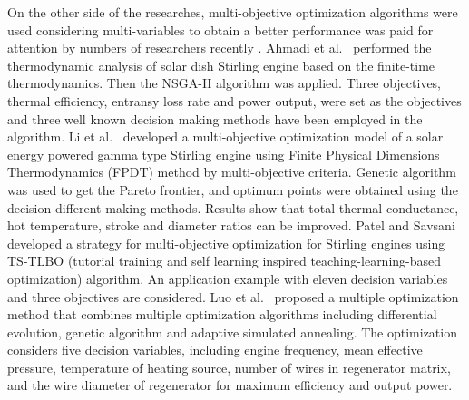 \documentclass[review,3p,10t]{elsarticle}
\begin{document}
On the other side of the researches, multi-objective optimization algorithms were used considering multi-variables to obtain a better performance was paid for attention by numbers of researchers recently%
.
Ahmadi et al.~\cite{Ahmadi2016} performed the thermodynamic analysis of solar dish Stirling engine based on the finite-time thermodynamics. Then the NSGA-II algorithm was applied. Three objectives, thermal efficiency, entransy loss rate and power output, were set as the objectives and three well known decision making methods have been employed in the algorithm.
Li et al.~\cite{Li2016b} developed a multi-objective optimization model of a solar energy powered gamma type Stirling engine using Finite Physical Dimensions Thermodynamics (FPDT) method by multi-objective criteria. Genetic algorithm was used to get the Pareto frontier, and optimum points were obtained using the decision different making methods. Results show that total thermal conductance, hot temperature, stroke and diameter ratios can be improved.
Patel and Savsani~\cite{Patel2016} developed a strategy for multi-objective optimization for Stirling engines using TS-TLBO (tutorial training and self learning inspired teaching-learning-based optimization) algorithm. An application example with eleven decision variables and three objectives are considered. 
Luo et al.~\cite{Luo2016} proposed a multiple optimization method that combines multiple optimization algorithms including differential evolution, genetic algorithm and adaptive simulated annealing. The optimization considers five decision variables, including engine frequency, mean effective pressure, temperature of heating source, number of wires in regenerator matrix, and the wire diameter of regenerator for maximum efficiency and output power.


\end{document}
